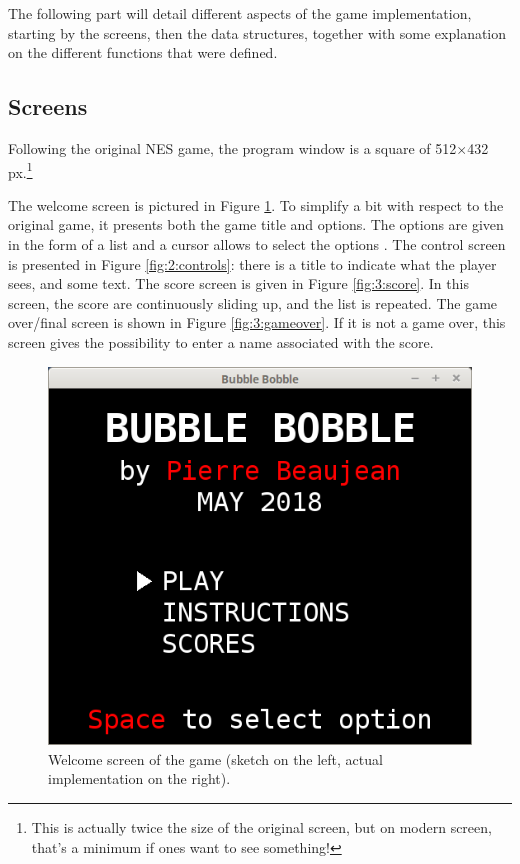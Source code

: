 \documentclass[12pt,a4paper]{article}
\begin{document}
The following part will detail different aspects of the game implementation, starting by the screens, then the data structures, together with some explanation on the different functions that were defined.

\subsection{Screens}

Following the original NES game, the program window is a square of 512$\times$432 px.\footnote{This is actually twice the size of the original screen, but on modern screen, that's a minimum if ones want to see something!}

The welcome screen is pictured in Figure \ref{fig:1:welcome}. To simplify a bit with respect to the original game, it presents both the game title and options. The options are given in the form of a list and a cursor allows to select the options . The control screen is presented in Figure \ref{fig:2:controls}: there is a title to indicate what the player sees, and some text. The score screen is given in Figure \ref{fig:3:score}. In this screen, the score are continuously sliding up, and the list is repeated. The game over/final screen is shown in Figure \ref{fig:3:gameover}. If it is not a game over, this screen gives the possibility to enter a name associated with the score.

\begin{figure}[!h]
	\centering
	\hspace{.5cm}
	\includegraphics[width=.45\linewidth]{i/screen1}
	
	\caption{Welcome screen of the game (sketch on the left, actual implementation on the right).}
	\label{fig:1:welcome}
\end{figure}
\end{document}
